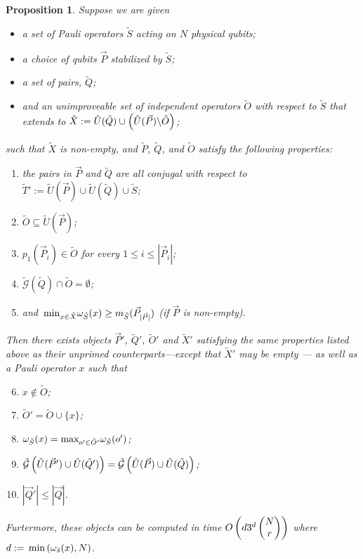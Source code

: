 \documentclass[twocolumn,showpacs,preprintnumbers,amsmath,amssymb,nofootinbib,pra,floatfix]{revtex4-1}
\newtheorem{proposition}{Proposition}
\newcommand{\lst}{\vec}
\newcommand{\set}{\tilde}
\newcommand{\genfun}{\tilde{\mathcal{G}}}
\begin{document}
\begin{proposition}
\label{proposition:optimization-iteration}
Suppose we are given
\begin{itemize}
\item a set of Pauli operators $\set S$ acting on $N$ physical qubits;
\item a choice of qubits $\lst P$ stabilized by $\set S$;
\item a set of pairs, $\set Q$;
\item and an unimproveable set of independent operators $\set O$ with respect to $\set S$ that extends to $\set X:=\set U(\set Q) \cup \paren{\set U(\lst P) \backslash \set O}$;
\end{itemize}
such that $\set X$ is non-empty, and $\set P$, $\set Q$, and $\set O$ satisfy the following properties:
\begin{enumerate}
\item \label{pairs are all conjugal to T} the pairs in $\lst P$ and $\set Q$ are all conjugal with respect to $\set T':=\set U(\lst P)\cup \set U(\set Q)\cup \set S$;
\item \label{O is subset of P} $\set O \subseteq \set U(\lst P)$;
\item \label{first members are all in O} $p_1(\lst P_i)\in \set O$ for every $1 \le i \le |\lst P_i|$;
\item \label{Q does not intersect with O} $\genfun(\set Q) \cap \set O = \emptyset$;
\item \label{operators in X are no worse than the best qubit in P} and $\min_{x\in\set X}\om_{\set S}(x)\ge m_{\set S}(\lst P_{|\lst P|})$ (if $\lst P$ is non-empty).
\end{enumerate}
Then there exists objects $\lst P'$, $\set Q'$, $\set O'$ and $\set X'$ satisfying the same properties listed above as their unprimed counterparts---\emph{except} that $\set X'$ may be empty --- as well as a Pauli operator $x$ such that
\begin{enumerate}
\setcounter{enumi}{5}
\item $x\notin \set O$;
\item $\set O'=\set O\cup\{x\}$;
\item $\om_{\set S}(x)=\max_{o'\in\set O'}\om_{\set S}(o')$;
\item $\genfun\paren{\set U(\lst P')\cup \set U(\set Q')}=\genfun\paren{\set U(\lst P)\cup \set U(\set Q)}$;
\item $|\lst Q'| \le |\lst Q|$.
\end{enumerate}
Furtermore, these objects can be computed in time $O\left(d3^d\left(\begin{matrix}N\\r\end{matrix}\right)\right)$ where $d:=\min\paren{\om_{\set s}(x),N}$.
\end{proposition}
\end{document}
